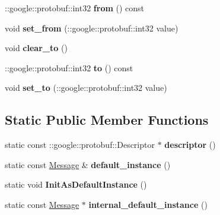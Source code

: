 \begin{DoxyCompactItemize}
\+::google\+::protobuf\+::int32 {\bfseries from} () const
\item 
\mbox{\label{classtbMessages_1_1Message_adf7ddb6d88680b898c6445a5bc34ff89}} 
void {\bfseries set\+\_\+from} (\+::google\+::protobuf\+::int32 value)
\item 
\mbox{\label{classtbMessages_1_1Message_a02d0d7f7659b37f8789949d7ca92275b}} 
void {\bfseries clear\+\_\+to} ()
\item 
\mbox{\label{classtbMessages_1_1Message_a416730d40824d5bcc6283779add997bd}} 
\+::google\+::protobuf\+::int32 {\bfseries to} () const
\item 
\mbox{\label{classtbMessages_1_1Message_a20ffd94ec1049633fcc75c4813d8b10c}} 
void {\bfseries set\+\_\+to} (\+::google\+::protobuf\+::int32 value)
\end{DoxyCompactItemize}
\subsection*{Static Public Member Functions}
\begin{DoxyCompactItemize}
\item 
\mbox{\label{classtbMessages_1_1Message_ac90186f57ae5f677585448203fcc8187}} 
static const \+::google\+::protobuf\+::\+Descriptor $\ast$ {\bfseries descriptor} ()
\item 
\mbox{\label{classtbMessages_1_1Message_a789e6472fb78ab9f0699e1636fac1749}} 
static const \hyperlink{classtbMessages_1_1Message}{Message} \& {\bfseries default\+\_\+instance} ()
\item 
\mbox{\label{classtbMessages_1_1Message_a7239bb85f0d35a8ab6ab3c462fa6e584}} 
static void {\bfseries Init\+As\+Default\+Instance} ()
\item 
\mbox{\label{classtbMessages_1_1Message_aec488300d54a5877cdc320e15ebb2c86}} 
static const \hyperlink{classtbMessages_1_1Message}{Message} $\ast$ {\bfseries internal\+\_\+default\+\_\+instance} ()
\end{DoxyCompactItemize}
